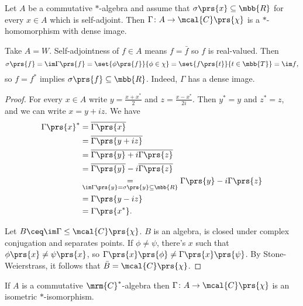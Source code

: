 \documentclass[10pt, twoside]{book}
\begin{document}
\begin{proposition}
Let $A$ be a commutative $*$-algebra and assume that $\sigma\prs{x} \subseteq \mbb{R}$ for every $x \in A$ which is self-adjoint. Then
$\Gamma \colon A \to \mcal{C}\prs{\chi}$
is a $*$-homomorphism with dense image.
\end{proposition}

\begin{example}
Take $A = W$. Self-adjointness of $f \in A$ means $f = \bar{f}$ so $f$ is real-valued. Then
\[\sigma\prs{f} = \im \Gamma\prs{f} = \set{\phi\prs{f}}{\phi \in \chi} = \set{f\prs{t}}{t \in \mbb{T}} = \im f \text{,}\]
so $f = f^*$ implies $\sigma\prs{f} \subseteq \mbb{R}$. Indeed, $\Gamma$ has a dense image.
\end{example}

\begin{proof}
For every $x \in A$ write
$y = \frac{x + x^*}{2}$ and $z = \frac{x-x^*}{2 i}$. Then $y^* = y$ and $z^* = z$, and we can write $x = y + iz$.
We have
\begin{align*}
\Gamma\prs{x}^* &= \overline{\Gamma\prs{x}}
\\&= \overline{\Gamma\prs{y+iz}}
\\&= \overline{\Gamma\prs{y} + i\Gamma\prs{z}}
\\&= \overline{\Gamma\prs{y}} - i \overline{\Gamma\prs{z}}
\\&\underset{\im \Gamma\prs{y} = \sigma\prs{y} \subseteq \mbb{R}}{=} \Gamma\prs{y} - i \Gamma\prs{z}
\\&= \Gamma\prs{y-iz}
\\&= \Gamma\prs{x^*} \text{.}
\end{align*}

Let $B \ceq \im \Gamma \leq \mcal{C}\prs{\chi}$. $B$ is an algebra, is closed under complex conjugation and separates points. If $\phi \neq \psi$, there's $x$ such that $\phi\prs{x} \neq \psi\prs{x}$, so $\Gamma\prs{x} \prs{\phi} \neq \Gamma\prs{x} \prs{\psi}$.
By Stone-Weierstrass, it follows that $\bar{B} = \mcal{C}\prs{\chi}$.
\end{proof}

\begin{theorem}
If $A$ is a commutative $\mrm{C}^*$-algebra then $\Gamma \colon A \to \mcal{C}\prs{\chi}$ is an isometric $*$-isomorphism.
\end{theorem}
\end{document}
